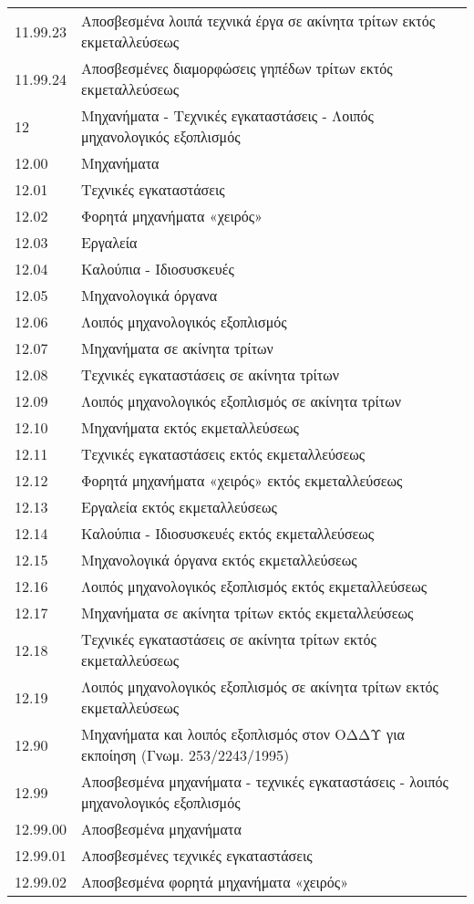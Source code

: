 \documentclass[A4,10pt,greek]{book}
\begin{document}
\begin{tabularx}{\linewidth}{lX}
11.99.23 & Αποσβεσμένα λοιπά τεχνικά έργα σε ακίνητα τρίτων εκτός εκμεταλλεύσεως\\
11.99.24 & Αποσβεσμένες διαμορφώσεις γηπέδων τρίτων εκτός εκμεταλλεύσεως\\
12 & Μηχανήματα - Τεχνικές εγκαταστάσεις - Λοιπός μηχανολογικός εξοπλισμός\\
12.00 & Μηχανήματα\\
12.01 & Τεχνικές εγκαταστάσεις\\
12.02 & Φορητά μηχανήματα «χειρός»\\
12.03 & Εργαλεία\\
12.04 & Καλούπια - Ιδιοσυσκευές\\
12.05 & Μηχανολογικά όργανα\\
12.06 & Λοιπός μηχανολογικός εξοπλισμός\\
12.07 & Μηχανήματα σε ακίνητα τρίτων\\
12.08 & Τεχνικές εγκαταστάσεις σε ακίνητα τρίτων\\
12.09 & Λοιπός μηχανολογικός εξοπλισμός σε ακίνητα τρίτων\\
12.10 & Μηχανήματα εκτός εκμεταλλεύσεως\\
12.11 & Τεχνικές εγκαταστάσεις εκτός εκμεταλλεύσεως\\
12.12 & Φορητά μηχανήματα «χειρός» εκτός εκμεταλλεύσεως\\
12.13 & Εργαλεία εκτός εκμεταλλεύσεως\\
12.14 & Καλούπια - Ιδιοσυσκευές εκτός εκμεταλλεύσεως\\
12.15 & Μηχανολογικά όργανα εκτός εκμεταλλεύσεως\\
12.16 & Λοιπός μηχανολογικός εξοπλισμός εκτός εκμεταλλεύσεως\\
12.17 & Μηχανήματα σε ακίνητα τρίτων εκτός εκμεταλλεύσεως\\
12.18 & Τεχνικές εγκαταστάσεις σε ακίνητα τρίτων εκτός εκμεταλλεύσεως\\
12.19 & Λοιπός μηχανολογικός εξοπλισμός σε ακίνητα τρίτων εκτός εκμεταλλεύσεως\\
12.90 & Μηχανήματα και λοιπός εξοπλισμός στον ΟΔΔΥ για εκποίηση (Γνωμ. 253/2243/1995)\\
12.99 & Αποσβεσμένα μηχανήματα - τεχνικές εγκαταστάσεις - λοιπός μηχανολογικός εξοπλισμός\\
12.99.00 & Αποσβεσμένα μηχανήματα\\
12.99.01 & Αποσβεσμένες τεχνικές εγκαταστάσεις\\
12.99.02 & Αποσβεσμένα φορητά μηχανήματα «χειρός»\\

\end{tabularx}
\end{document}

